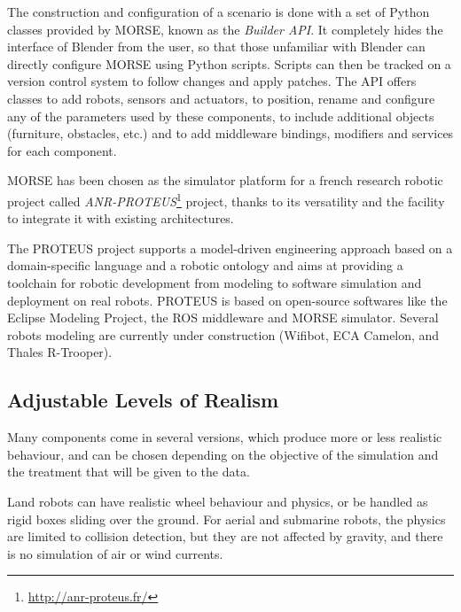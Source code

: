 \documentclass{llncs}
\begin{document}
The construction and configuration of a scenario is done with a set of Python
classes provided by MORSE, known as the \emph{Builder API}. It completely hides
the interface of Blender from the user, so that those unfamiliar with Blender
can directly configure MORSE using Python scripts. Scripts can then be tracked
on a version control system to follow changes and apply patches.
The API offers classes to add robots, sensors and actuators, to position,
rename and configure any of the parameters used by these components, to
include additional objects (furniture, obstacles, etc.) and to add middleware
bindings, modifiers and services for each component.

MORSE has been chosen as the simulator platform for a french research
robotic project called \emph{ANR-PROTEUS}\footnote{\url{http://anr-proteus.fr/}}
project, thanks to its versatility and the facility to integrate it with
existing architectures.

The PROTEUS project supports a model-driven engineering approach based
on a domain-specific language and a robotic
ontology\cite{Dhouib:2011zr} and aims at providing a toolchain for robotic development from modeling to software simulation
and deployment on real robots. PROTEUS is based on open-source
softwares like the Eclipse Modeling Project, the ROS middleware and
MORSE simulator.
Several robots modeling are currently under construction (Wifibot, ECA Camelon, and Thales R-Trooper).

\subsection{Adjustable Levels of Realism}
\label{section:realism}

Many components come in several versions, which produce more or less
realistic behaviour, and can be chosen depending on the objective of the
simulation and the treatment that will be given to the data.

Land robots can have realistic wheel behaviour and physics, or be handled as
rigid boxes sliding over the ground. For aerial and submarine robots, the
physics are limited to collision detection, but they are not affected by
gravity, and there is no simulation of air or wind currents.
\end{document}
